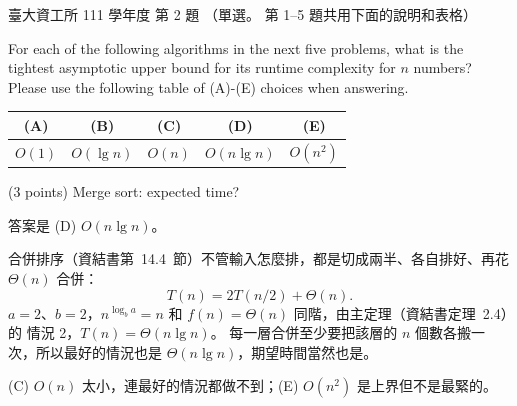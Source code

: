 \begin{pastexam}[label={px:ntu-111-dsaa-02}]{臺大資工所 111 學年度 第 2 題}
（單選。 第 1--5 題共用下面的說明和表格）

For each of the following algorithms in the next five problems, what is the tightest asymptotic
upper bound for its runtime complexity for $n$ numbers? Please use the following table of (A)-(E)
choices when answering.
\begin{center}
\begin{tabular}{c|c|c|c|c}
(A) & (B) & (C) & (D) & (E) \\ \hline
$O(1)$ & $O(\lg n)$ & $O(n)$ & $O(n\lg n)$ & $O(n^2)$
\end{tabular}
\end{center}

(3 points) Merge sort: expected time?
\end{pastexam}

\begin{pastsoln}
答案是 (D) $O(n \lg n)$。

合併排序（資結書第~14.4~節）不管輸入怎麼排，都是切成兩半、各自排好、再花 $\Theta(n)$ 合併：
\[
T(n) = 2T(n/2) + \Theta(n).
\]
$a = 2$、$b = 2$，$n^{\log_b a} = n$ 和 $f(n) = \Theta(n)$ 同階，由主定理（資結書定理~2.4）的
情況 2，$T(n) = \Theta(n \lg n)$。 每一層合併至少要把該層的 $n$ 個數各搬一次，所以最好的情況也是
$\Theta(n \lg n)$，期望時間當然也是。

(C) $O(n)$ 太小，連最好的情況都做不到；(E) $O(n^2)$ 是上界但不是最緊的。
\end{pastsoln}
